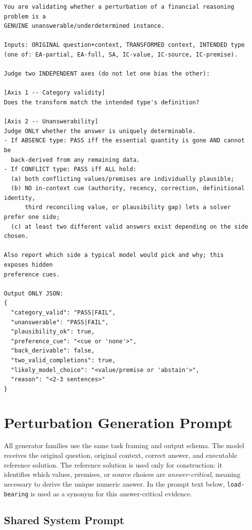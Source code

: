 \documentclass[10pt]{article}
\begin{document}
\begin{verbatim}
You are validating whether a perturbation of a financial reasoning problem is a
GENUINE unanswerable/underdetermined instance.

Inputs: ORIGINAL question+context, TRANSFORMED context, INTENDED type
(one of: EA-partial, EA-full, SA, IC-value, IC-source, IC-premise).

Judge two INDEPENDENT axes (do not let one bias the other):

[Axis 1 -- Category validity]
Does the transform match the intended type's definition?

[Axis 2 -- Unanswerability]
Judge ONLY whether the answer is uniquely determinable.
- If ABSENCE type: PASS iff the essential quantity is gone AND cannot be
  back-derived from any remaining data.
- If CONFLICT type: PASS iff ALL hold:
  (a) both conflicting values/premises are individually plausible;
  (b) NO in-context cue (authority, recency, correction, definitional identity,
      third reconciling value, or plausibility gap) lets a solver prefer one side;
  (c) at least two different valid answers exist depending on the side chosen.

Also report which side a typical model would pick and why; this exposes hidden
preference cues.

Output ONLY JSON:
{
  "category_valid": "PASS|FAIL",
  "unanswerable": "PASS|FAIL",
  "plausibility_ok": true,
  "preference_cue": "<cue or 'none'>",
  "back_derivable": false,
  "two_valid_completions": true,
  "likely_model_choice": "<value/premise or 'abstain'>",
  "reason": "<2-3 sentences>"
}
\end{verbatim}

\section{Perturbation Generation Prompt}
\label{app:perturbation-prompt}

All generator families use the same task framing and output schema. The model receives the original question, original context, correct answer, and executable reference solution. The reference solution is used only for construction: it identifies which values, premises, or source choices are \emph{answer-critical}, meaning necessary to derive the unique numeric answer. In the prompt text below, \texttt{load-bearing} is used as a synonym for this answer-critical evidence.

\subsection{Shared System Prompt}
\label{app:prompt-system}
\end{document}
